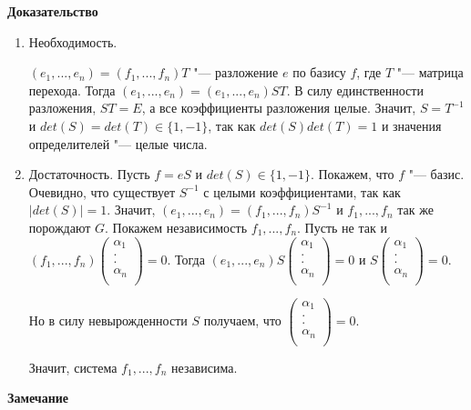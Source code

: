 \documentclass{article}
\begin{document}
\textbf{Доказательство}
\begin{enumerate}
	\item Необходимость.
	
	$(e_1, ..., e_n) = (f_1, ..., f_n)T$ "--- разложение $e$ по базису $f$, где $T$ "--- матрица перехода. Тогда $(e_1, ..., e_n) = (e_1, ..., e_n)ST$. В силу единственности разложения, $ST = E$, а все коэффициенты разложения целые. Значит, $S = T^{-1}$ и $det(S) = det(T) \in \{1, -1\}$, так как $det(S)det(T) = 1$ и значения определителей "--- целые числа.
	
	\item Достаточность. Пусть $f = eS$ и $det(S) \in \{1, -1\}$. Покажем, что $f$ "--- базис. Очевидно, что существует $S^{-1}$ с целыми коэффициентами, так как $|det(S)| = 1$. Значит, $(e_1, ..., e_n) = (f_1, ..., f_n)S^{-1}$ и $f_1, ..., f_n$ так же порождают $G$. Покажем независимость $f_1, ..., f_n$. Пусть не так и $(f_1, ..., f_n)\begin{pmatrix}
	\alpha_1\\
	.\\
	.\\
	\alpha_n\\
	\end{pmatrix} = 0$. Тогда $(e_1, ..., e_n)S\begin{pmatrix}
	\alpha_1\\
	.\\
	.\\
	\alpha_n\\
	\end{pmatrix} = 0$ и $S\begin{pmatrix}
	\alpha_1\\
	.\\
	.\\
	\alpha_n\\
	\end{pmatrix} = 0$.

Но в силу невырожденности $S$ получаем, что $\begin{pmatrix}
	\alpha_1\\
	.\\
	.\\
	\alpha_n\\
	\end{pmatrix} = 0$.
	
	Значит, система $f_1, ..., f_n$ независима.	
\end{enumerate}

\vspace{5pt}

\textbf{Замечание}
\end{document}
